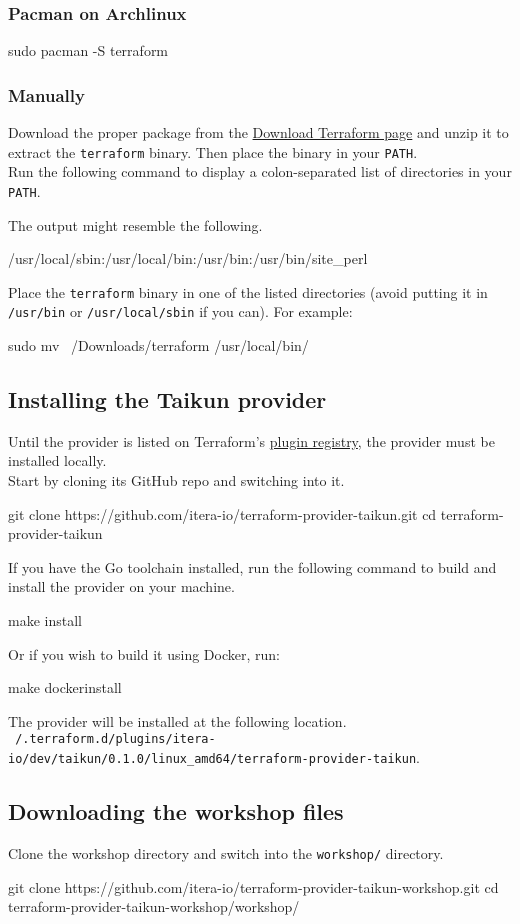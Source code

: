 \subsubsection{Pacman on Archlinux}
\begin{shell}
sudo pacman -S terraform
\end{shell}

\subsubsection{Manually}
Download the proper package from the \href{https://www.terraform.io/downloads.html}{Download Terraform page}
and unzip it to extract the \texttt{terraform} binary.
Then place the binary in your \texttt{PATH}.\\

Run the following command to display a colon-separated list of directories in your \texttt{PATH}.
The output might resemble the following.
\begin{raw}
/usr/local/sbin:/usr/local/bin:/usr/bin:/usr/bin/site_perl
\end{raw}
Place the \texttt{terraform} binary in one of the listed directories (avoid putting it in \texttt{/usr/bin} or \texttt{/usr/local/sbin} if you can).
For example:
\begin{shell}
sudo mv ~/Downloads/terraform /usr/local/bin/
\end{shell}

\subsection{Installing the Taikun provider}
Until the provider is listed on Terraform's \href{https://registry.terraform.io/browse/providers}{plugin registry},
the provider must be installed locally.\\

Start by cloning its GitHub repo and switching into it.
\begin{shell}
git clone https://github.com/itera-io/terraform-provider-taikun.git
cd terraform-provider-taikun
\end{shell}
If you have the Go toolchain installed,
run the following command to build and install the provider on your machine.
\begin{shell}
make install
\end{shell}
Or if you wish to build it using Docker, run:
\begin{shell}
make dockerinstall
\end{shell}
The provider will be installed at the following location.\\
\texttt{~/.terraform.d/plugins/itera-io/dev/taikun/0.1.0/linux\_amd64/terraform-provider-taikun}.

\subsection{Downloading the workshop files}
Clone the workshop directory and switch into the \texttt{workshop/} directory.
\begin{shell}
git clone https://github.com/itera-io/terraform-provider-taikun-workshop.git
cd terraform-provider-taikun-workshop/workshop/
\end{shell}
